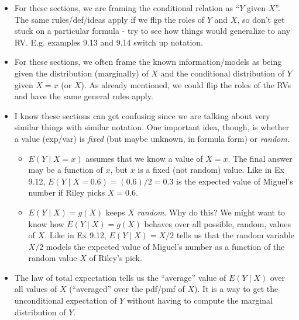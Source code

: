 \documentclass[
  letterpaper,
]{scrbook}
\providecommand{\tightlist}{%
  \setlength{\itemsep}{0pt}\setlength{\parskip}{0pt}}\usepackage{longtable,booktabs,array}
\begin{document}
\begin{itemize}
\item
  For these sections, we are framing the conditional relation as ``\(Y\)
  given \(X\)''. The same rules/def/ideas apply if we flip the roles of
  \(Y\) and \(X\), so don't get stuck on a particular formula - try to
  see how things would generalize to any RV. E.g. examples 9.13 and 9.14
  switch up notation.
\item
  For these sections, we often frame the known information/models as
  being given the distribution (marginally) of \(X\) and the conditional
  distribution of \(Y\) given \(X=x\) (or \(X\)). As already mentioned,
  we could flip the roles of the RVs and have the same general rules
  apply.
\item
  I know these sections can get confusing since we are talking about
  very similar things with similar notation. One important idea, though,
  is whether a value (exp/var) is \emph{fixed} (but maybe unknown, in
  formula form) or \emph{random.}

  \begin{itemize}
  \tightlist
  \item
    \(E(Y \mid X=x)\) assumes that we know a value of \(X=x\). The final
    answer may be a function of \(x\), but \(x\) is a fixed (not random)
    value. Like in Ex 9.12, \(E(Y \mid X=0.6) = (0.6)/2=0.3\) is the
    expected value of Miguel's number if Riley picks \(X=0.6\).
  \item
    \(E(Y \mid X) = g(X)\) keeps \(X\) \emph{random}. Why do this? We
    might want to know how \(E(Y \mid X) = g(X)\) behaves over all
    possible, random, values of \(X\). Like in Ex 9.12,
    \(E(Y \mid X) = X/2\) tells us that the random variable \(X/2\)
    models the expected value of Miguel's number as a function of the
    random value \(X\) of Riley's pick.
  \end{itemize}
\item
  The law of total expectation tells us the ``average'' value of
  \(E(Y \mid X)\) over all values of \(X\) (``averaged'' over the
  pdf/pmf of \(X\)). It is a way to get the unconditional expectation of
  \(Y\) without having to compute the marginal distribution of \(Y\).


\end{itemize}
\end{document}
